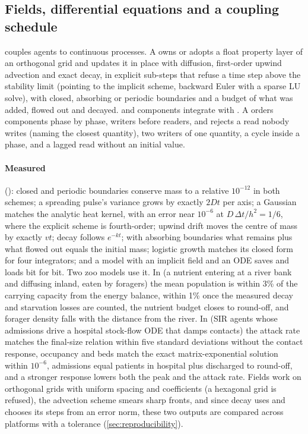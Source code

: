 \subsection{Fields, differential equations and a coupling schedule}
\label{app:couple}

 couples agents to continuous processes. A  owns or adopts a
float property layer of an orthogonal grid and updates it in place with diffusion, first-order
upwind advection and exact decay, in explicit sub-steps that refuse a time step above the
stability limit (pointing to the implicit scheme, backward Euler with a sparse LU solve), with
closed, absorbing or periodic boundaries and a budget of what was added, flowed out and
decayed.  and  components integrate with . A
 orders components phase by phase, writers before readers, and 
rejects a read nobody writes (naming the closest quantity), two writers of one quantity, a
cycle inside a phase, and a lagged read without an initial value.

\paragraph{Measured} (): closed and periodic boundaries conserve mass to a
relative $10^{-12}$ in both schemes; a spreading pulse's variance grows by exactly $2Dt$ per
axis; a Gaussian matches the analytic heat kernel, with an error near $10^{-6}$ at $D\,\Delta
t/h^2 = 1/6$, where the explicit scheme is fourth-order; upwind drift moves the centre of mass
by exactly $vt$; decay follows $e^{-kt}$; with absorbing boundaries what remains plus what
flowed out equals the initial mass; logistic growth matches its closed form for four
integrators; and a model with an implicit field and an ODE saves and loads bit for bit. Two
zoo models use it. In  (a nutrient entering at a river bank and
diffusing inland, eaten by foragers) the mean population is within 3\% of the carrying
capacity from the energy balance, within 1\% once the measured decay and starvation losses
are counted, the nutrient budget closes to round-off, and forager density falls with the
distance from the river. In  (SIR agents whose admissions drive a
hospital stock-flow ODE that damps contacts) the attack rate matches the final-size relation
within five standard deviations without the contact response, occupancy and beds match the
exact matrix-exponential solution within $10^{-6}$, admissions equal patients in hospital plus
discharged to round-off, and a stronger response lowers both the peak and the attack rate.
Fields work on orthogonal grids with uniform spacing and coefficients (a hexagonal grid is
refused), the advection scheme smears sharp fronts, and since decay uses  and
 chooses its steps from an error norm, these two outputs are compared across
platforms with a tolerance (\cref{sec:reproducibility}).

